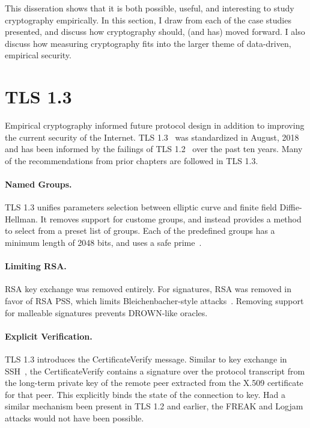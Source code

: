 This disseration shows that it is both possible, useful, and interesting to
study cryptography empirically. In this section, I draw from each of the case
studies presented, and discuss how cryptography should, (and has) moved
forward. I also discuss how measuring cryptography fits into the larger theme
of data-driven, empirical security.

\section{TLS 1.3}

Empirical cryptography informed future protocol design in addition to
improving the current security of the Internet. TLS 1.3~\cite{rfc8446} was
standardized in August, 2018 and has been informed by the failings of TLS
1.2~\cite{tls-ietf-inria-bug,tls-ietf-smacktls,tls-ietf-rsa-pss} over the
past ten years. Many of the recommendations from prior chapters are followed
in TLS 1.3.

\paragraph{Named Groups.}
TLS 1.3 unifies parameters selection between elliptic curve and finite field
Diffie-Hellman. It removes support for custome \dhe{} groups, and instead
provides a method to select from a preset list of groups. Each of the
predefined groups has a minimum length of 2048 bits, and uses a safe
prime~\cite{rfc7919}.

\paragraph{Limiting RSA.}
RSA key exchange was removed entirely. For signatures, RSA \PKCS was removed
in favor of RSA PSS, which limits Bleichenbacher-style
attacks~\cite{exact-security-rsa}. Removing support for malleable \PKCS
signatures prevents DROWN-like oracles.

\paragraph{Explicit Verification.}
TLS 1.3 introduces the \textsf{CertificateVerify} message. Similar to key
exchange in SSH~\cite{rfc4253}, the \textsf{CertificateVerify} contains a
signature over the protocol transcript from the long-term private key of the
remote peer extracted from the X.509 certificate for that peer. This
explicitly binds the state of the connection to key. Had a similar mechanism
been present in TLS 1.2 and earlier, the FREAK and Logjam attacks would not
have been possible.

